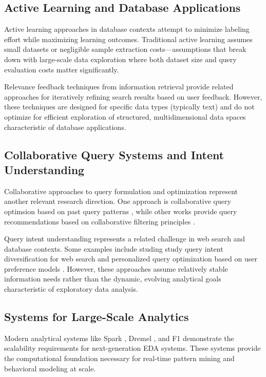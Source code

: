 \documentclass[sigconf, nonacm]{acmart}
\begin{document}
\subsection{Active Learning and Database Applications}

Active learning approaches in database contexts attempt to minimize labeling effort while maximizing learning outcomes. Traditional active learning assumes small datasets or negligible sample extraction costs—assumptions that break down with large-scale data exploration where both dataset size and query evaluation costs matter significantly.

Relevance feedback techniques from information retrieval \cite{rocchio1971relevance} provide related approaches for iteratively refining search results based on user feedback. However, these techniques are designed for specific data types (typically text) and do not optimize for efficient exploration of structured, multidimensional data spaces characteristic of database applications.

\subsection{Collaborative Query Systems and Intent Understanding}

Collaborative approaches to query formulation and optimization represent another relevant research direction. One approach is collaborative query optimsion based on past query patterns \cite{khoussainova2009perfxact}, while other works provide query recommendations based on collaborative filtering principles \cite{stefanidis2009you}.

Query intent understanding represents a related challenge in web search and database contexts. Some examples include studing study query intent diversification for web search \cite{agrawal2009diversifying} and personalized query optimization based on user preference models \cite{koutrika2005constrained}. However, these approaches assume relatively stable information needs rather than the dynamic, evolving analytical goals characteristic of exploratory data analysis.

\subsection{Systems for Large-Scale Analytics}

Modern analytical systems like Spark \cite{zaharia2016apache}, Dremel \cite{melnik2010dremel}, and F1 \cite{shute2013f1} demonstrate the scalability requirements for next-generation EDA systems. These systems provide the computational foundation necessary for real-time pattern mining and behavioral modeling at scale.
\end{document}
